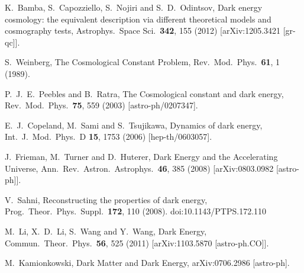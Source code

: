 \documentclass[aps,prd,nofootinbib,amsmath,amssymb,superscriptaddress,twocolumn,10pt]{revtex4}%
\begin{document}
\begin{thebibliography}{99}
  K.~Bamba, S.~Capozziello, S.~Nojiri and S.~D.~Odintsov,
  Dark energy cosmology: the equivalent description via different theoretical models and cosmography tests,
  Astrophys.\ Space Sci.\  {\bf 342}, 155 (2012)
  [arXiv:1205.3421 [gr-qc]].

  S.~Weinberg,
  The Cosmological Constant Problem,
  Rev.\ Mod.\ Phys.\  {\bf 61}, 1 (1989).

  P.~J.~E.~Peebles and B.~Ratra,
  The Cosmological constant and dark energy,
  Rev.\ Mod.\ Phys.\  {\bf 75}, 559 (2003)
  [astro-ph/0207347].

  E.~J.~Copeland, M.~Sami and S.~Tsujikawa,
  Dynamics of dark energy,
  Int.\ J.\ Mod.\ Phys.\ D {\bf 15}, 1753 (2006)
  [hep-th/0603057].

  J.~Frieman, M.~Turner and D.~Huterer,
  Dark Energy and the Accelerating Universe,
  Ann.\ Rev.\ Astron.\ Astrophys.\  {\bf 46}, 385 (2008)
  [arXiv:0803.0982 [astro-ph]].

  V.~Sahni,
  Reconstructing the properties of dark energy,
  Prog.\ Theor.\ Phys.\ Suppl.\  {\bf 172}, 110 (2008).
  doi:10.1143/PTPS.172.110

  M.~Li, X.~D.~Li, S.~Wang and Y.~Wang,
  Dark Energy,
  Commun.\ Theor.\ Phys.\  {\bf 56}, 525 (2011)
  [arXiv:1103.5870 [astro-ph.CO]].

  M.~Kamionkowski,
  Dark Matter and Dark Energy,
  arXiv:0706.2986 [astro-ph].






\end{thebibliography}
\end{document}
